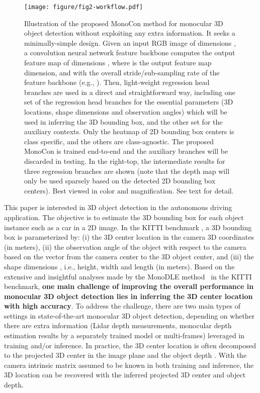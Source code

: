 \documentclass[letterpaper]{article} \usepackage{aaai22}  \usepackage{times}  \usepackage{helvet}  \usepackage{courier}  \usepackage[hyphens]{url}  \usepackage{graphicx} \urlstyle{rm} \def\UrlFont{\rm}  \usepackage{natbib}  \usepackage{caption} \DeclareCaptionStyle{ruled}{labelfont=normalfont,labelsep=colon,strut=off} \frenchspacing  \setlength{\pdfpagewidth}{8.5in}  \setlength{\pdfpageheight}{11in}  \usepackage{algorithm}
\begin{document}
\begin{figure*}[t]
    \centering
    \texttt{[image: figure/fig2-workflow.pdf]}
\caption{\small Illustration of the proposed MonoCon method for monocular 3D object detection without exploiting any extra information. It seeks a minimally-simple design. Given an input RGB image of dimensions , a convolution neural network feature backbone computes the output feature map of dimensions , where  is the output feature map dimension,  and  with  the overall stride/sub-sampling rate of the feature backbone (e.g., ). Then, light-weight regression head branches are used in a direct and straightforward way, including one set of the regression head branches for the essential parameters (3D locations, shape dimensions and  observation angles) which will be used in inferring the 3D bounding box, and the other set for the auxiliary contexts. Only the heatmap of 2D bounding box centers is class specific, and the others are class-agnostic. The proposed MonoCon is trained end-to-end and the auxiliary branches will be discarded in testing. In the right-top, the intermediate results for three regression branches are shown (note that the depth map will only be used sparsely based on the detected 2D bounding box centers). Best viewed in color and magnification. See text for detail. }
    \label{fig:workflow} 
    \vspace{-2mm}
\end{figure*}

This paper is interested in 3D object detection in the autonomous driving application. The objective is to estimate the 3D bounding box for each object instance such as a car in a 2D image. In the KITTI benchmark \cite{kitti}, a 3D bounding box is parameterized by: (i) the 3D center location  in the camera 3D coordinates (in meters), (ii)  the observation angle  of the object  with respect to the camera based on the vector from the camera center to the 3D object center,  and (iii) the shape dimensions , i.e., height, width and length (in meters).
Based on the extensive and insightful analyses made by the MonoDLE method~\cite{monodle} in the KITTI benchmark, 
\textbf{one main challenge of improving the overall performance in monocular 3D object detection lies in inferring the 3D center location with high accuracy}. 
  To address the challenge, there are two main types of settings in state-of-the-art monocular 3D object detection, depending on whether there are extra information (Lidar depth measurements,  monocular depth estimation results by a separately trained model or multi-frames) leveraged in training and/or  inference. In practice, the 3D center location  is often decomposed to the projected 3D center in the image plane  and the object depth . With the camera intrinsic matrix assumed to be known in both training and inference, the 3D location can be recovered with the inferred projected 3D center and object depth. 
  
\end{document}

